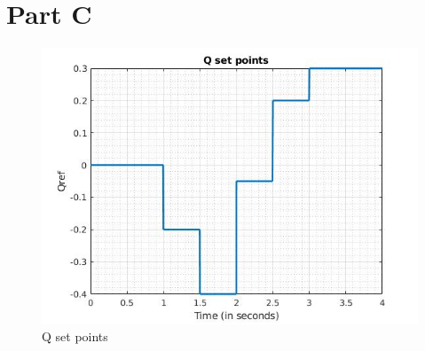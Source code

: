 \section*{Part C}
\begin{figure}[H]
    \centering
        \includegraphics[width=0.8 \linewidth]{images_a7/Q_setpoints.jpg}
        \caption{Q set points}
        \label{fig:Q_set}   
\end{figure}

